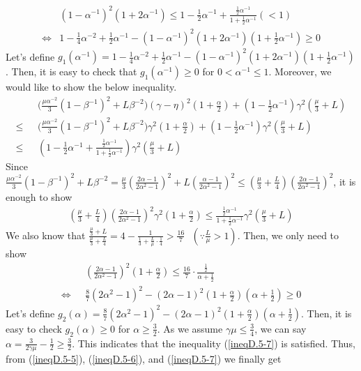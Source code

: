 \documentclass[11pt]{article}
\begin{document}
\begin{align} \label{ineqD.5-6}
    &(1-\alpha^{-1})^2(1+2\alpha^{-1}) \leq 1-\frac{1}{2}\alpha^{-1}+\frac{\frac{1}{2}\alpha^{-1}}{1+\frac{1}{2}\alpha^{-1}} \textrm{}(<1) \\
    \Leftrightarrow \textrm{} &1-\frac{1}{4}\alpha^{-2}+\frac{1}{2}\alpha^{-1} - (1-\alpha^{-1})^2(1+2\alpha^{-1})(1+\frac{1}{2}\alpha^{-1}) \geq 0 \nonumber
\end{align}
Let's define $g_1(\alpha^{-1}) = 1-\frac{1}{4}\alpha^{-2}+\frac{1}{2}\alpha^{-1} - (1-\alpha^{-1})^2(1+2\alpha^{-1})(1+\frac{1}{2}\alpha^{-1})$. Then, it is easy to check that $g_1(\alpha^{-1}) \geq 0$ for $0 < \alpha^{-1} \leq 1$. Moreover, we would like to show the below inequality.
\begin{align} \label{ineqD.5-7}
    &\Big(\frac{\mu\alpha^{-2}}{3}(1-\beta^{-1})^2 + L\beta^{-2}\Big)(\gamma-\eta)^2(1+\frac{\alpha}{2}) + (1-\frac{1}{2}\alpha^{-1})\gamma^2(\frac{\mu}{3}+L) \nonumber \\
    \leq \textrm{ } &\Big(\frac{\mu\alpha^{-2}}{3}(1-\beta^{-1})^2 + L\beta^{-2}\Big)\gamma^2(1+\frac{\alpha}{2}) + (1-\frac{1}{2}\alpha^{-1})\gamma^2(\frac{\mu}{3}+L) \nonumber\\
    \leq \textrm{ } &(1-\frac{1}{2}\alpha^{-1}+\frac{\frac{1}{2}\alpha^{-1}}{1+\frac{1}{2}\alpha^{-1}})\gamma^2(\frac{\mu}{3}+L)
\end{align}
Since $\frac{\mu\alpha^{-2}}{3}(1-\beta^{-1})^2 + L\beta^{-2} = \frac{\mu}{3}(\frac{2\alpha-1}{2\alpha^2-1})^2 + L(\frac{\alpha-1}{2\alpha^2-1})^2 \leq (\frac{\mu}{3}+\frac{L}{4})(\frac{2\alpha-1}{2\alpha^2-1})^2$, it is enough to show
\begin{align*}
    (\frac{\mu}{3}+\frac{L}{4})(\frac{2\alpha-1}{2\alpha^2-1})^2\gamma^2 (1+\frac{\alpha}{2}) \leq \frac{\frac{1}{2}\alpha^{-1}}{1+\frac{1}{2}\alpha^{-1}} \gamma^2 (\frac{\mu}{3}+L)
\end{align*}
We also know that $\frac{\frac{\mu}{3}+L}{\frac{\mu}{3}+\frac{L}{4}}=4-\frac{1}{\frac{1}{3}+\frac{L}{\mu}\cdot\frac{1}{4}} > \frac{16}{7} \textrm{ }(\because \frac{L}{\mu}>1)$. Then, we only need to show
\begin{align*}
    &(\frac{2\alpha-1}{2\alpha^2-1})^2(1+\frac{\alpha}{2}) \leq \frac{16}{7}\cdot\frac{\frac{1}{2}}{\alpha+\frac{1}{2}} \\
    \Leftrightarrow \textrm{ } &\frac{8}{7}(2\alpha^2 -1)^2 - (2\alpha-1)^2(1+\frac{\alpha}{2})(\alpha+\frac{1}{2}) \geq 0
\end{align*}
Let's define $g_2(\alpha) = \frac{8}{7}(2\alpha^2 -1)^2 - (2\alpha-1)^2(1+\frac{\alpha}{2})(\alpha+\frac{1}{2})$. Then, it is easy to check $g_2(\alpha) \geq 0$ for $\alpha \geq \frac{3}{2}$. As we assume $\gamma\mu \leq \frac{3}{4}$, we can say $\alpha = \frac{3}{2\gamma\mu}-\frac{1}{2} \geq \frac{3}{2}$. This indicates that the inequality (\ref{ineqD.5-7}) is satisfied. Thus, from (\ref{ineqD.5-5}), (\ref{ineqD.5-6}), and (\ref{ineqD.5-7}) we finally get
\end{document}
